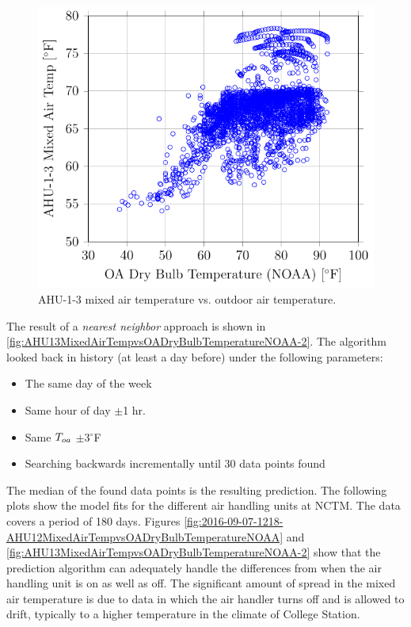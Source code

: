 \begin{figure}
\centering
\includegraphics[]{Plots/2016-06-13-1459-AHU13MixedAirTempvsOADryBulbTemperatureNOAA.pdf}
\caption{AHU-1-3 mixed air temperature vs. outdoor air temperature.}
\label{fig:AHU13MixedAirTempvsOADryBulbTemperatureNOAA}
\end{figure}


The result of a \textit{nearest neighbor} approach is shown in \figref{} \ref{fig:AHU13MixedAirTempvsOADryBulbTemperatureNOAA-2}. The algorithm looked back in history (at least a day before) under the following parameters:

\begin{itemize}
    \item The same day of the week
    \item Same hour of day \(\pm\)1 hr.
    \item Same \(T_{oa}{}\) \(\pm\)3\(^\circ\)F
    \item Searching backwards incrementally until 30 data points found
\end{itemize}

The median of the found data points is the resulting prediction. The following
plots show the model fits for the different air handling units at NCTM. The
data covers a period of 180 days. Figures
\ref{fig:2016-09-07-1218-AHU12MixedAirTempvsOADryBulbTemperatureNOAA} and
\ref{fig:AHU13MixedAirTempvsOADryBulbTemperatureNOAA-2} show that the
prediction algorithm can adequately handle the differences from when the air
handling unit is on as well as off. The significant amount of spread in the
mixed air temperature is due to data in which the air handler turns off and is
allowed to drift, typically to a higher temperature in the climate of College
Station. 

